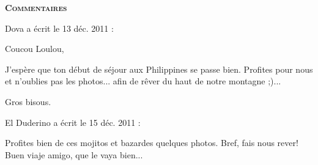 \bigskip
\textbf{\textsc{Commentaires}}

\medskip
Dova a écrit le 13 déc. 2011 :
\begin{displayquote}
Coucou Loulou,

J'espère que ton début de séjour aux Philippines se passe bien.
Profites pour nous et n'oublies pas les photos... afin de rêver du haut de notre montagne ;)...

Gros bisous.
\end{displayquote}

\medskip
El Duderino a écrit le 15 déc. 2011 :
\begin{displayquote}
Profites bien de ces mojitos et bazardes quelques photos. Bref, fais nous rever!
Buen viaje amigo, que le vaya bien...
\end{displayquote}

\vfill
